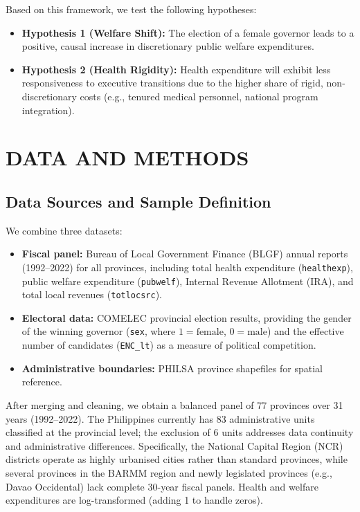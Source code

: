 \documentclass[conference]{IEEEtran}
\begin{document}
Based on this framework, we test the following hypotheses:
\begin{itemize}
    \item \textbf{Hypothesis 1 (Welfare Shift):} The election of a female governor leads to a positive, causal increase in discretionary public welfare expenditures.
    \item \textbf{Hypothesis 2 (Health Rigidity):} Health expenditure will exhibit less responsiveness to executive transitions due to the higher share of rigid, non-discretionary costs (e.g., tenured medical personnel, national program integration).
\end{itemize}

\section{DATA AND METHODS}

\subsection{Data Sources and Sample Definition}
We combine three datasets:
\begin{itemize}
\item \textbf{Fiscal panel:} Bureau of Local Government Finance (BLGF) annual reports (1992--2022) for all provinces, including total health expenditure (\texttt{healthexp}), public welfare expenditure (\texttt{pubwelf}), Internal Revenue Allotment (IRA), and total local revenues (\texttt{totlocsrc}).
\item \textbf{Electoral data:} COMELEC provincial election results, providing the gender of the winning governor (\texttt{sex}, where $1=\text{female}$, $0=\text{male}$) and the effective number of candidates (\texttt{ENC\_lt}) as a measure of political competition.
\item \textbf{Administrative boundaries:} PHILSA province shapefiles for spatial reference.
\end{itemize}

After merging and cleaning, we obtain a balanced panel of 77 provinces over 31 years (1992--2022). The Philippines currently has 83 administrative units classified at the provincial level; the exclusion of 6 units addresses data continuity and administrative differences. Specifically, the National Capital Region (NCR) districts operate as highly urbanised cities rather than standard provinces, while several provinces in the BARMM region and newly legislated provinces (e.g., Davao Occidental) lack complete 30-year fiscal panels. Health and welfare expenditures are log-transformed (adding 1 to handle zeros).
\end{document}
